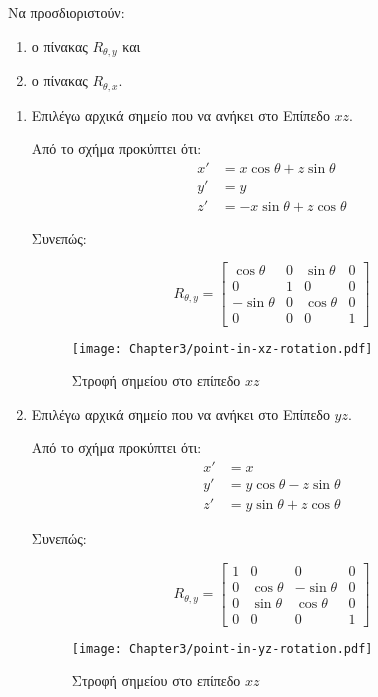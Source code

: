 \begin{exercise}
		Να προσδιοριστούν:
	\begin{enumerate}
	  \item ο πίνακας $R_{\theta, y}$ και
	  \item ο πίνακας $R_{\theta, x}$.
	\end{enumerate}
\end{exercise}

\begin{solution}
\begin{enumerate}
	
\item  Επιλέγω αρχικά σημείο που να ανήκει στο Επίπεδο $xz$.
	
		Από το σχήμα προκύπτει ότι: 
		\begin{align*}
		x' &= x\cos{\theta} + z\sin{\theta}	\\
		y' &= y \\
		z' &= -x\sin{\theta} + z\cos{\theta}	
		\end{align*}
		
		Συνεπώς:
		
		\[
		R_{\theta, y}= 
		\begin{bmatrix}
		\cos{\theta} & 0 & \sin{\theta} & 0 \\
		0 & 1 & 0 & 0 \\
		-\sin{\theta} & 0 & \cos{\theta} & 0 \\
		0 & 0 & 0 & 1
		\end{bmatrix} 
		\]	
		
		\begin{figure}[hbt]
		\begin{center}
		\texttt{[image: Chapter3/point-in-xz-rotation.pdf]}
		\end{center}
		\caption{Στροφή σημείου στο επίπεδο $xz$}
		\end{figure}

	
\item  Επιλέγω αρχικά σημείο που να ανήκει στο Επίπεδο $yz$.
	
		Από το σχήμα προκύπτει ότι: 
		\begin{align*}
		x' &= x \\
		y' &= y\cos{\theta} - z\sin{\theta}	\\
		z' &= y\sin{\theta} + z\cos{\theta}	
		\end{align*}
		
		Συνεπώς:
		
		\[
		R_{\theta, y}= 
		\begin{bmatrix}
		1 & 0 & 0 & 0 \\
		0 & \cos{\theta} & -\sin{\theta} & 0 \\
		0 & \sin{\theta} & \cos{\theta} & 0 \\
		0 & 0 & 0 & 1
		\end{bmatrix} 
		\]	
		
		\begin{figure}[hbt]
		\begin{center}
		\texttt{[image: Chapter3/point-in-yz-rotation.pdf]}
		\end{center}
		\caption{Στροφή σημείου στο επίπεδο $xz$}
		\end{figure}
		
\end{enumerate}		
\end{solution}